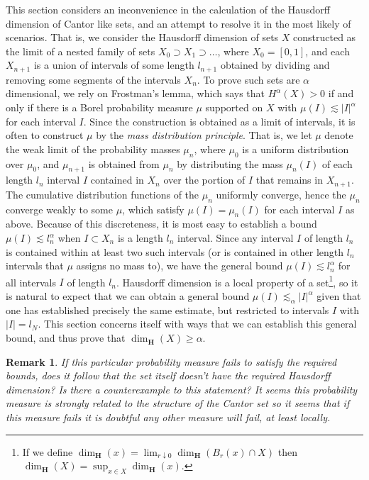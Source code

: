 \documentclass{report}
\theoremstyle{plain}
\theoremstyle{plain}
\newtheorem*{remark}{Remark}
\begin{document}
This section considers an inconvenience in the calculation of the Hausdorff dimension of Cantor like sets, and an attempt to resolve it in the most likely of scenarios. That is, we consider the Hausdorff dimension of sets $X$ constructed as the limit of a nested family of sets $X_0 \supset X_1 \supset \dots$, where $X_0 = [0,1]$, and each $X_{n+1}$ is a union of intervals of some length $l_{n+1}$ obtained by dividing and removing some segments of the intervals $X_n$. To prove such sets are $\alpha$ dimensional, we rely on Frostman's lemma, which says that $H^\alpha(X) > 0$ if and only if there is a Borel probability measure $\mu$ supported on $X$ with $\mu(I) \lesssim |I|^\alpha$ for each interval $I$. Since the construction is obtained as a limit of intervals, it is often to construct $\mu$ by the {\it mass distribution principle}. That is, we let $\mu$ denote the weak limit of the probability masses $\mu_n$, where $\mu_0$ is a uniform distribution over $\mu_0$, and $\mu_{n+1}$ is obtained from $\mu_n$ by distributing the mass $\mu_n(I)$ of each length $l_n$ interval $I$ contained in $X_n$ over the portion of $I$ that remains in $X_{n+1}$. The cumulative distribution functions of the $\mu_n$ uniformly converge, hence the $\mu_n$ converge weakly to some $\mu$, which satisfy $\mu(I) = \mu_n(I)$ for each interval $I$ as above. Because of this discreteness, it is most easy to establish a bound $\mu(I) \lesssim l_n^\alpha$ when $I \subset X_n$ is a length $l_n$ interval. Since any interval $I$ of length $l_n$ is contained within at least two such intervals (or is contained in other length $l_n$ intervals that $\mu$ assigns no mass to), we have the general bound $\mu(I) \lesssim l_n^\alpha$ for all intervals $I$ of length $l_n$. Hausdorff dimension is a local property of a set\footnote{If we define $\dim_{\mathbf{H}}(x) = \lim_{r \downarrow 0} \dim_{\mathbf{H}}(B_r(x) \cap X)$ then $\dim_{\mathbf{H}}(X) = \sup_{x \in X} \dim_{\mathbf{H}}(x)$.}, so it is natural to expect that we can obtain a general bound $\mu(I) \lesssim_\alpha|I|^\alpha$ given that one has established precisely the same estimate, but restricted to intervals $I$ with $|I| = l_N$. This section concerns itself with ways that we can establish this general bound, and thus prove that $\dim_{\mathbf{H}}(X) \geq \alpha$.

\begin{remark}
    If this particular probability measure fails to satisfy the required bounds, does it follow that the set itself doesn't have the required Hausdorff dimension? Is there a counterexample to this statement? It seems this probability measure is strongly related to the structure of the Cantor set so it seems that if this measure fails it is doubtful any other measure will fail, at least locally.
\end{remark}
\end{document}
